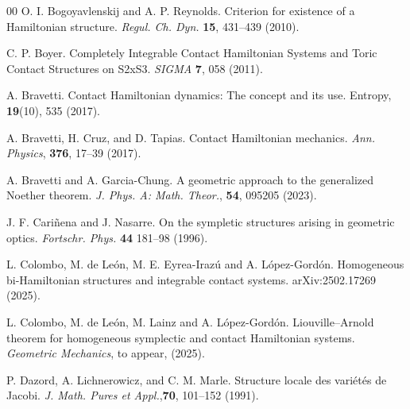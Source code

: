 \documentclass[10pt]{amsart}
\numberwithin{equation}{section}
\newcommand{\tbf}{\textbf}
\theoremstyle{definition}
\begin{document}
\begin{thebibliography}{00}
 O. I. Bogoyavlenskij and A. P. Reynolds. Criterion for existence of a Hamiltonian structure. \textit{Regul. Ch. Dyn.} \textbf{15}, 431--439 (2010).

 C. P. Boyer. Completely Integrable Contact Hamiltonian Systems and Toric Contact Structures on S2xS3. \textit{SIGMA} \tbf{7}, 058 (2011).



 A. Bravetti. Contact Hamiltonian dynamics: The concept and its use. Entropy, \tbf{19}(10), 535 (2017).

 A. Bravetti, H. Cruz, and D. Tapias. Contact Hamiltonian mechanics. \textit{Ann. Physics}, \tbf{376}, 17–39 (2017).

 A. Bravetti and A. Garcia-Chung. A geometric approach to the generalized Noether theorem. \textit{J. Phys. A: Math. Theor.}, \tbf{54}, 095205 (2023).


 J. F. Cariñena  and J. Nasarre.  On the sympletic structures arising in geometric optics. \textit{Fortschr. Phys.} \tbf{44} 181–98  (1996).


 L. Colombo, M. de León, M. E. Eyrea-Irazú and A. López-Gordón. Homogeneous bi-Hamiltonian structures and integrable contact systems. arXiv:2502.17269 (2025).

 L. Colombo, M. de León, M. Lainz and A. López-Gordón. Liouville--Arnold theorem for homogeneous symplectic and contact Hamiltonian systems. \textit{Geometric Mechanics}, to appear, (2025).


 P. Dazord, A. Lichnerowicz, and C. M. Marle. Structure locale des vari\'et\'es de Jacobi. \textit{J. Math. Pures et Appl.},\tbf{70}, 101–152 (1991).


\end{thebibliography}
\end{document}
